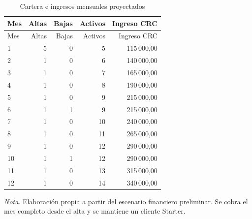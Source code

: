 \begin{longtable}{lrrrr}
\caption{Cartera e ingresos mensuales proyectados}\\
\toprule
Mes & Altas & Bajas & Activos & Ingreso CRC \\
\midrule
\endfirsthead
\toprule
Mes & Altas & Bajas & Activos & Ingreso CRC \\
\midrule
\endhead
1 & 5 & 0 & 5 & 115\,000,00 \\
2 & 1 & 0 & 6 & 140\,000,00 \\
3 & 1 & 0 & 7 & 165\,000,00 \\
4 & 1 & 0 & 8 & 190\,000,00 \\
5 & 1 & 0 & 9 & 215\,000,00 \\
6 & 1 & 1 & 9 & 215\,000,00 \\
7 & 1 & 0 & 10 & 240\,000,00 \\
8 & 1 & 0 & 11 & 265\,000,00 \\
9 & 1 & 0 & 12 & 290\,000,00 \\
10 & 1 & 1 & 12 & 290\,000,00 \\
11 & 1 & 0 & 13 & 315\,000,00 \\
12 & 1 & 0 & 14 & 340\,000,00 \\
\bottomrule
\end{longtable}
{\small\textit{Nota}. Elaboración propia a partir del escenario financiero preliminar. Se cobra el mes completo desde el alta y se mantiene un cliente Starter.}
